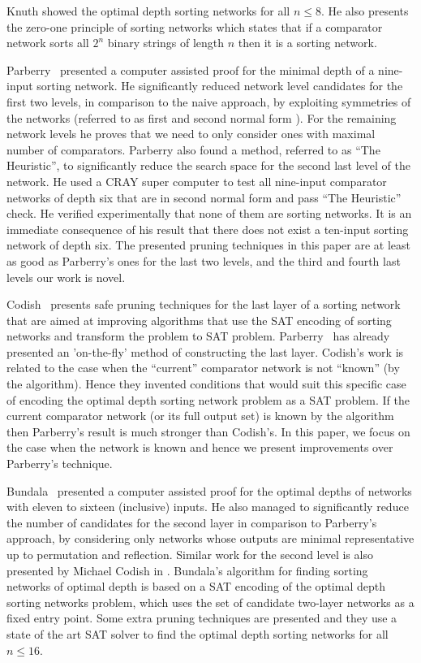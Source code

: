 \documentclass[13pt,a4paper]{article}
\begin{document}
Knuth \cite{Knuth73} showed the optimal depth sorting networks for all $n \leq 8$. He also presents the zero-one principle of sorting networks which states that if a comparator network sorts all $2^n$ binary strings of length $n$ then it is a sorting network.

Parberry~\cite{Parberry89} presented a computer assisted proof for the minimal depth of a nine-input sorting network. He significantly reduced network level candidates for the first two levels, in comparison to the naive approach, by exploiting symmetries of the networks (referred to as first and second normal form \cite{Parberry89}). For the remaining network levels he proves that we need to only consider ones with maximal number of comparators. Parberry also found a method, referred to as ``The Heuristic'', to significantly reduce the search space for the second last level of the network. He used a CRAY super computer to test all nine-input comparator networks of depth six that are in second normal form and pass ``The Heuristic'' check. He verified experimentally that none of them are sorting networks. It is an immediate consequence of his result that there does not exist a ten-input sorting network of depth six. The presented pruning techniques in this paper are at least as good as Parberry's ones for the last two levels, and the third and fourth last levels our work is novel.

Codish~\cite{CodishCS14a_The_End_Game} presents safe pruning techniques for the last layer of a sorting network that are aimed at improving algorithms that use the SAT encoding of sorting networks and transform the problem to SAT problem. Parberry~\cite{Parberry89} has already presented an 'on-the-fly' method of constructing the last layer. Codish's work is related to the case when the ``current'' comparator network is not ``known'' (by the algorithm). Hence they invented conditions that would suit this specific case of encoding the optimal depth sorting network problem as a SAT problem.  If the current comparator network (or its full output set) is known by the algorithm then Parberry's result is much stronger than Codish's. In this paper, we focus on the case when the network is known and hence we present improvements over Parberry's technique.

Bundala~\cite{BundalaCCSZ14_Optimal_Depth} presented a computer assisted proof for the optimal depths of networks with eleven to sixteen (inclusive) inputs. He also managed to significantly reduce the number of candidates for the second layer in comparison to Parberry's approach, by considering only networks whose outputs are minimal representative up to permutation and reflection. Similar work for the second level is also presented by Michael Codish in \cite{CodishCS14:Two_Layer_Prefix}. Bundala's algorithm for finding sorting networks of optimal depth is based on a SAT encoding of the optimal depth sorting networks problem, which uses the set of candidate two-layer networks as a fixed entry point. Some extra pruning techniques are presented and they use a state of the art SAT solver to find the optimal depth sorting networks for all $n \leq 16$. 
\end{document}
